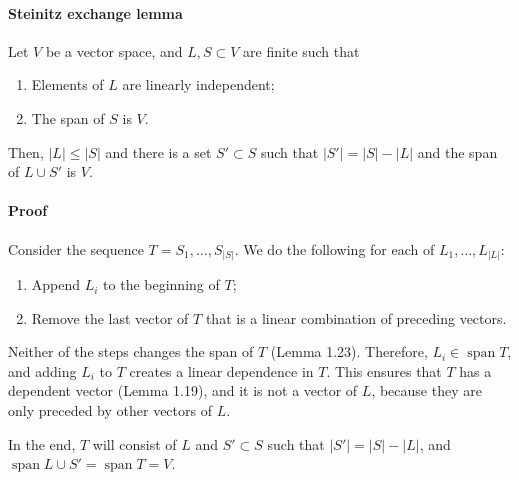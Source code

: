 \documentclass{article}
\begin{document}
\paragraph{Steinitz exchange lemma} Let $V$ be a vector space, and $L, S \subset V$ are finite such that

\begin{enumerate}
    \item Elements of $L$ are linearly independent;
    \item The span of $S$ is $V$.
\end{enumerate}

Then, $|L| \leq |S|$ and there is a set $S' \subset S$ such that $|S'| = |S| - |L|$ and the span of $L \cup S'$ is $V$.    

\paragraph{Proof}

Consider the sequence $T=S_1,\dots,S_{|S|}$. We do the following for each of $L_1,\dots,L_{|L|}$:

\begin{enumerate}
    \item Append $L_i$ to the beginning of $T$;
    \item Remove the last vector of $T$ that is a linear combination of preceding vectors.
\end{enumerate}

Neither of the steps changes the span of $T$ (Lemma 1.23). Therefore, $L_i \in \operatorname{span} T$, and adding $L_i$ to $T$ creates a linear dependence in $T$. This ensures that $T$ has a dependent vector (Lemma 1.19), and it is not a vector of $L$, because they are only preceded by other vectors of $L$.

In the end, $T$ will consist of $L$ and $S' \subset S$ such that $|S'| = |S| - |L|$, and $\operatorname{span} L \cup S' = \operatorname{span} T = V$.
\end{document}
